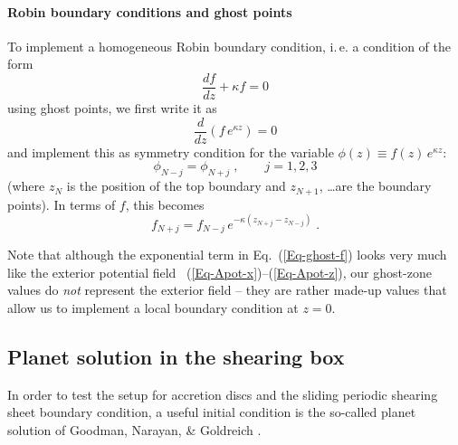 \documentclass[\mydriver,12pt,twoside,notitlepage,a4paper]{article}
\begin{document}
\paragraph{Robin boundary conditions and ghost points}
To implement a homogeneous Robin boundary condition, i.\,e. a condition of
the form
\begin{equation}
  \dfrac{df}{dz} + \kappa f = 0
\end{equation}
using ghost points, we first write it as
\begin{equation}
  \dfrac{d}{dz} \left( f\,e^{\kappa z} \right)
  = 0
\end{equation}
and implement this as symmetry condition for the variable
$\phi(z) \equiv f(z)\,e^{\kappa z}$:
\begin{equation}
  \phi_{N-j} = \phi_{N+j} \; , \qquad j=1,2,3
\end{equation}
(where $z_N$ is the position of the top boundary and $z_{N+1}$, \ldots are
the boundary points).
In terms of $f$, this becomes
\begin{equation}
  \label{Eq-ghost-f}
  f_{N+j} = f_{N-j}\, e^{-\kappa(z_{N+j} - z_{N-j})} \; .
\end{equation}

Note that although the exponential term in Eq.~(\ref{Eq-ghost-f}) looks
very much like the exterior potential field
~(\ref{Eq-Apot-x})--(\ref{Eq-Apot-z}), our ghost-zone values do \emph{not}
represent the exterior field -- they are rather made-up values that allow
us to implement a local boundary condition at $z=0$.



\subsection{Planet solution in the shearing box}
\label{S-planet}

In order to test the setup for accretion discs and the sliding periodic
shearing sheet boundary condition, a useful initial condition is the
so-called planet solution of Goodman, Narayan, \& Goldreich \cite{GNG87}.
\end{document}
